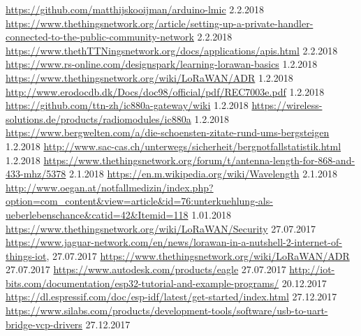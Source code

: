 \documentclass[11pt,english,german]{report}
\theoremstyle{definition}
\begin{document}
\begin{thebibliography}{1}
	 \url{https://github.com/matthijskooijman/arduino-lmic} 2.2.2018
	 \url{https://www.thethingsnetwork.org/article/setting-up-a-private-handler-connected-to-the-public-community-network} 2.2.2018
	 \url{https://www.thethTTNingsnetwork.org/docs/applications/apis.html} 2.2.2018
	 \url{https://www.rs-online.com/designspark/learning-lorawan-basics} 1.2.2018
	 \url{https://www.thethingsnetwork.org/wiki/LoRaWAN/ADR} 1.2.2018
	 \url{http://www.erodocdb.dk/Docs/doc98/official/pdf/REC7003e.pdf} 1.2.2018
	 \url{https://github.com/ttn-zh/ic880a-gateway/wiki} 1.2.2018
	 \url{https://wireless-solutions.de/products/radiomodules/ic880a} 1.2.2018
	 \url{https://www.bergwelten.com/a/die-schoensten-zitate-rund-ums-bergsteigen} 1.2.2018
	 \url{http://www.sac-cas.ch/unterwegs/sicherheit/bergnotfallstatistik.html} 1.2.2018
	 \url{https://www.thethingsnetwork.org/forum/t/antenna-length-for-868-and-433-mhz/5378} 2.1.2018
	 \url{https://en.m.wikipedia.org/wiki/Wavelength} 2.1.2018\\
	 \url{http://www.oegan.at/notfallmedizin/index.php?option=com_content&view=article&id=76:unterkuehlung-als-ueberlebenschance&catid=42&Itemid=118} 1.01.2018
	 \url{https://www.thethingsnetwork.org/wiki/LoRaWAN/Security} 27.07.2017
	 \url{https://www.jaguar-network.com/en/news/lorawan-in-a-nutshell-2-internet-of-things-iot}, 27.07.2017
	 \url{https://www.thethingsnetwork.org/wiki/LoRaWAN/ADR} 27.07.2017
	 \url{https://www.autodesk.com/products/eagle} 27.07.2017
	 \url{http://iot-bits.com/documentation/esp32-tutorial-and-example-programs/} 20.12.2017
	 \url{https://dl.espressif.com/doc/esp-idf/latest/get-started/index.html} 27.12.2017
	 \url{https://www.silabs.com/products/development-tools/software/usb-to-uart-bridge-vcp-drivers} 27.12.2017
\end{thebibliography}
\end{document}
